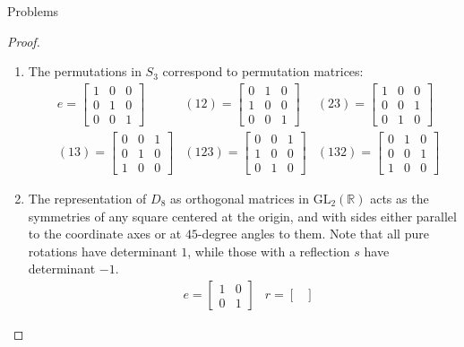 \documentclass[12pt]{article}
\newcommand{\R}{\mathbb{R}}
\theoremstyle{definition}
\newenvironment{problem}[2][Problem]{\begin{trivlist}
\item[\hskip \labelsep {\bfseries #1}\hskip \labelsep {\bfseries #2.}]}{\end{trivlist}}
\begin{document}
\begin{section}{Problems}
\begin{problem}{2}
\begin{enumerate}[label=(\alph*)]
	\end{enumerate}
\end{problem}
\begin{proof}
	\begin{enumerate}[label=(\alph*)]
		\item The permutations in $S_3$ correspond to permutation matrices:
			\begin{align*}
				&e = \begin{bmatrix}
					1 & 0 & 0 \\ 0 & 1 & 0 \\0 & 0 & 1
				\end{bmatrix}  &(12) = \begin{bmatrix}
					0 & 1 & 0 \\1 & 0 & 0\\0 & 0 & 1
				\end{bmatrix}  &(23) = \begin{bmatrix}
					1 & 0 & 0\\0 & 0 & 1\\ 0 & 1 & 0
				\end{bmatrix}\\ &(13) = \begin{bmatrix}
					0 & 0 & 1\\ 0 & 1 & 0 \\ 1 & 0 & 0
				\end{bmatrix} & (123) = \begin{bmatrix}
				0 & 0 & 1 \\1& 0 & 0 \\ 0 & 1 & 0 
			\end{bmatrix} & (132) = \begin{bmatrix}
				0 & 1 & 0\\0 & 0 & 1\\1 & 0 &0 
			\end{bmatrix}
			\end{align*}
		\item The representation of $D_8$ as orthogonal matrices in $\text{GL}_2(\R)$ acts as the symmetries of any square centered at the origin, and with sides either parallel to the coordinate axes or at $45$-degree angles to them. Note that all pure rotations have determinant $1$, while those with a reflection $s$ have determinant $-1$.
			\begin{align*}
				&e = \begin{bmatrix}
					 1 & 0 \\0 & 1
				 \end{bmatrix} &r = \begin{bmatrix}

\end{bmatrix}
\end{align*}
\end{enumerate}
\end{proof}
\end{section}
\end{document}
